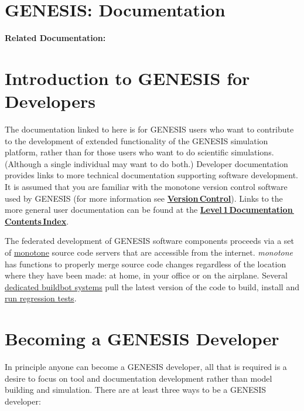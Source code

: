\documentclass[12pt]{article}
\begin{document}
\section*{GENESIS: Documentation}

{\bf Related Documentation:}

\section*{Introduction to GENESIS for Developers}

The documentation linked to here is for GENESIS users who want to contribute to the development of extended functionality of the GENESIS simulation platform, rather than for those users who want to do scientific simulations. (Although a single individual may want to do both.) Developer documentation provides links to more technical documentation supporting software development. It is assumed that you are familiar with the monotone version control software used by GENESIS (for more information see \href{../version-control/version-control.tex}{\bf Version\,Control}). Links to the more general user documentation can be found at the \href{http://www.genesis-sim.org/userdocs/contents-level1/contents-level1.html}{\bf Level\,1\,Documentation\,Contents\,Index}. 

The federated development of GENESIS software components proceeds via
a set of \href{http://monotone.ca/}{monotone} source code servers that
are accessible from the internet. {\it monotone} has functions to
properly merge source code changes regardless of the location where
they have been made: at home, in your office or on the airplane.
Several \href{../genesis-system/genesis-system.tex}{dedicated buildbot
  systems} pull the latest version of the code to build, install and
\href{../neurospaces-tester/neurospaces-tester.tex}{run regression
  tests}.

\section*{Becoming a GENESIS Developer}

In principle anyone can become a GENESIS developer, all that is required is a desire to focus on tool and documentation development rather than model building and simulation. There are at least three ways to be a GENESIS  developer:
\end{document}
